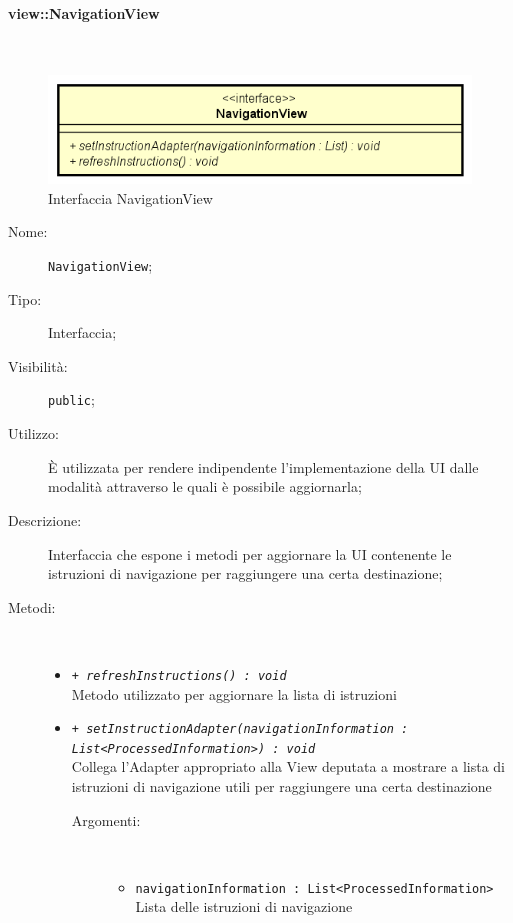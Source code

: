 \documentclass[../DefinizioneDiProdotto.tex]{subfiles}
\begin{document}
\paragraph{view::NavigationView}
\
\begin{figure}[H]
	\centering
	\includegraphics[width=\maxwidth]{img/NavigationView.png}
	\caption{Interfaccia NavigationView}\label{fig:view::NavigationView} 
\end{figure}
\begin{description}
	\item[Nome:] \texttt{NavigationView};
	\item[Tipo:] Interfaccia;
	\item[Visibilità:] \texttt{public};
	\item[Utilizzo:] È utilizzata per rendere indipendente l'implementazione della UI dalle modalità attraverso le quali è possibile aggiornarla;
	\item[Descrizione:] Interfaccia che espone i metodi per aggiornare la UI contenente le istruzioni di navigazione per raggiungere una certa destinazione;
	\item[Metodi:] \
	\begin{itemize}
		\item \texttt{+ \textit{refreshInstructions() : void}}\\
		Metodo utilizzato per aggiornare la lista di istruzioni 
		\item \texttt{+ \textit{setInstructionAdapter(navigationInformation : \\ List<ProcessedInformation>) : void}}\\
		Collega l'Adapter appropriato alla View deputata a mostrare a lista di istruzioni di navigazione utili per raggiungere una certa destinazione
		\begin{description}
			\item[Argomenti:] \
			\begin{itemize}
				\item \texttt{navigationInformation : List<ProcessedInformation>}\\
				Lista delle istruzioni di navigazione\end{itemize}
		\end{description}
	\end{itemize}
\end{description}
\end{document}
